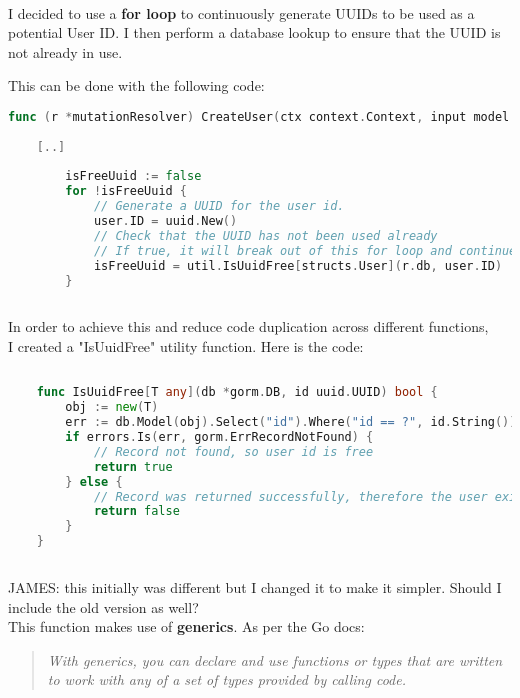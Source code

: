 \documentclass[../../main.tex]{subfiles}
\begin{document}
\noindent \\ I decided to use a \textbf{for loop} to continuously generate UUIDs to be used as a potential User ID. I then perform a database lookup to ensure that the UUID is not already in use.

This can be done with the following code:

\begin{lstlisting}[language=Go]
    func (r *mutationResolver) CreateUser(ctx context.Context, input model.NewUser) (*structs.User, error) {
    
    [..]
    
        isFreeUuid := false
        for !isFreeUuid {
            // Generate a UUID for the user id.
            user.ID = uuid.New()
            // Check that the UUID has not been used already
            // If true, it will break out of this for loop and continue.
            isFreeUuid = util.IsUuidFree[structs.User](r.db, user.ID)
        }
    
    \end{lstlisting}

\noindent In order to achieve this and reduce code duplication across different functions, \\
I created a "IsUuidFree" utility function. Here is the code:

\begin{lstlisting}[language=Go]
    
    func IsUuidFree[T any](db *gorm.DB, id uuid.UUID) bool {
        obj := new(T)
        err := db.Model(obj).Select("id").Where("id == ?", id.String()).First(&obj).Error
        if errors.Is(err, gorm.ErrRecordNotFound) {
            // Record not found, so user id is free
            return true
        } else {
            // Record was returned successfully, therefore the user exists
            return false
        }
    }
    
    \end{lstlisting}

JAMES: this initially was different but I changed it to make it simpler. Should I include the old version as well?\\

\noindent This function makes use of \textbf{generics}. As per the Go docs:

\begin{quotation}
    \textit{
        With generics, you can declare and use functions or types that are written to work with any of a set of types provided by calling code.
    }
\end{quotation}
\end{document}
